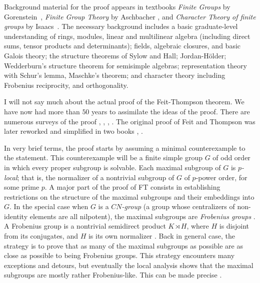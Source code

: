 \documentclass[brochure,english,12pt]{bourbaki}
\theoremstyle{plain}
\begin{document}
Background material for the proof appears in
textbooks {\it Finite Groups} by Gorenstein~\cite{gorenstein2007finite}, 
 {\it Finite  Group Theory} by Aschbacher \cite{aschbacher2000finite}, and 
{\it Character Theory of finite groups} by Isaacs~\cite{isaacs2013character}.
The necessary background includes a basic graduate-level understanding of rings, 
modules, linear and multilinear algebra (including 
direct sums, tensor
products  and determinants);
fields, algebraic closures, and basic Galois theory; the structure theorems of Sylow and Hall; Jordan-H\"older;
Wedderburn's structure theorem for semisimple algebras; representation theory with Schur's lemma, Maschke's theorem; 
and character theory including Frobenius reciprocity, and orthogonality. 

I will not say much about the actual proof of the 
Feit-Thompson theorem.
We have now had
more than 
$50$ years to assimilate the ideas of the proof.  
There are numerous surveys of the proof \cite[p. 450]{gorenstein2007finite}, \cite{glauberman1999new}, 
\cite{thompson1968nonsolvable},
\cite{Sol01}.
The original proof of Feit and Thompson was later reworked  and simplified in two books \cite{bender1994local},
\cite{peterfalvi2000character}.

In very brief terms, the proof starts by assuming a minimal counterexample to the statement.  This
counterexample will be a finite simple group $G$ of odd order in which every proper subgroup is solvable.
Each maximal subgroup of $G$ is {\it $p$-local}; that is, the normalizer of a nontrivial subgroup
of $G$ of $p$-power order, for some prime $p$.  A major part of the proof of FT consists in establishing
restrictions on the structure of the maximal subgroups and their embeddings into $G$.
In the special case when $G$ is a {\it $CN$-group} (a group whose centralizers of non-identity elements are all nilpotent),
the maximal subgroups are {\it Frobenius groups} \cite{FHT}.  
A Frobenius group is
a nontrivial semidirect product $K\rtimes H$, where $H$ is disjoint from its conjugates, and $H$ is its own normalizer \cite[Th. 7.7]{gorenstein2007finite}.
Back in general case, the strategy is to prove that as many of the maximal subgroups as possible are as close as possible to
being Frobenius groups.  This strategy encounters many exceptions and detours, but eventually the local
analysis shows that the maximal subgroups are mostly rather Frobenius-like. 
This can be made precise \cite[Sec. 16]{bender1994local}.
\end{document}

